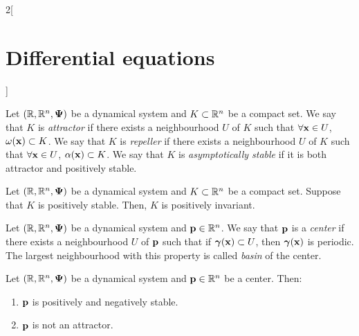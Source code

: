 \documentclass[../../../main.tex]{subfiles}
\begin{document}
\begin{multicols}{2}[\section{Differential equations}]
  \begin{definition}
    Let $(\mathbb{R},\mathbb{R}^n,\boldsymbol{\mathrm{\Psi}})$ be a dynamical system and $K\subset \mathbb{R}^n$ be a compact set. We say that $K$ is \textit{attractor} if there exists a neighbourhood $U$ of $K$ such that $\forall \boldsymbol{\mathrm{x}}\in U$, $\omega(\boldsymbol{\mathrm{x}})\subset K$.  We say that $K$ is \textit{repeller} if there exists a neighbourhood $U$ of $K$ such that $\forall \boldsymbol{\mathrm{x}}\in U$, $\alpha(\boldsymbol{\mathrm{x}})\subset K$. We say that $K$ is \textit{asymptotically stable} if it is both attractor and positively stable.
  \end{definition}
  \begin{prop}
    Let $(\mathbb{R},\mathbb{R}^n,\boldsymbol{\mathrm{\Psi}})$ be a dynamical system and $K\subset \mathbb{R}^n$ be a compact set. Suppose that $K$ is positively stable. Then, $K$ is positively invariant.
  \end{prop}
  \begin{definition}
    Let $(\mathbb{R},\mathbb{R}^n,\boldsymbol{\mathrm{\Psi}})$ be a dynamical system and $\boldsymbol{\mathrm{p}}\in\mathbb{R}^n$. We say that $\boldsymbol{\mathrm{p}}$ is a \textit{center} if there exists a neighbourhood $U$ of $\boldsymbol{\mathrm{p}}$ such that if $\boldsymbol{\mathrm{\gamma}}(\boldsymbol{\mathrm{x}})\subset U$, then $\boldsymbol{\mathrm{\gamma}}(\boldsymbol{\mathrm{x}})$ is periodic. The largest neighbourhood with this property is called \textit{basin} of the center.
  \end{definition}
  \begin{prop}
    Let $(\mathbb{R},\mathbb{R}^n,\boldsymbol{\mathrm{\Psi}})$ be a dynamical system and $\boldsymbol{\mathrm{p}}\in\mathbb{R}^n$ be a center. Then:
    \begin{enumerate}
      \item $\boldsymbol{\mathrm{p}}$ is positively and negatively stable.
      \item $\boldsymbol{\mathrm{p}}$ is not an attractor.
    \end{enumerate}
  \end{prop}

\end{multicols}
\end{document}
